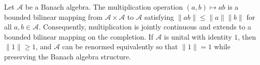 Let $\mathcal{A}$ be a Banach algebra. The multiplication operation $(a, b) \mapsto ab$ is a bounded bilinear mapping from $\mathcal{A} \times \mathcal{A}$ to $\mathcal{A}$ satisfying $\|ab\| \leq \|a\| \|b\|$ for all $a, b \in \mathcal{A}$. Consequently, multiplication is jointly continuous and extends to a bounded bilinear mapping on the completion. If $\mathcal{A}$ is unital with identity $1$, then $\|1\| \geq 1$, and $\mathcal{A}$ can be renormed equivalently so that $\|1\| = 1$ while preserving the Banach algebra structure.
